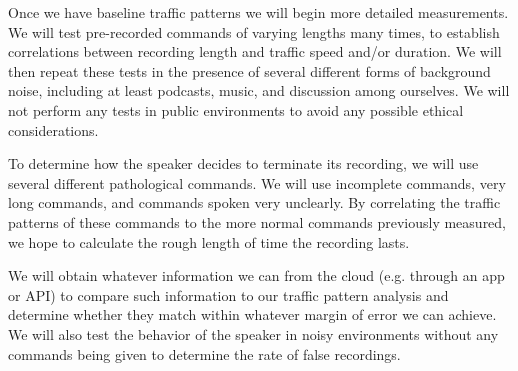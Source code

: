 Once we have baseline traffic patterns we will begin more detailed measurements. We will test pre-recorded commands of varying lengths many times, to establish correlations between recording length and traffic speed and/or duration. We will then repeat these tests in the presence of several different forms of background noise, including at least podcasts, music, and discussion among ourselves. We will not perform any tests in public environments to avoid any possible ethical considerations.

To determine how the speaker decides to terminate its recording, we will use several different pathological commands. We will use incomplete commands, very long commands, and commands spoken very unclearly. By correlating the traffic patterns of these commands to the more normal commands previously measured, we hope to calculate the rough length of time the recording lasts.

We will obtain whatever information we can from the cloud (e.g. through an app or API) to compare such information to our traffic pattern analysis and determine whether they match within whatever margin of error we can achieve. We will also test the behavior of the speaker in noisy environments without any commands being given to determine the rate of false recordings.
